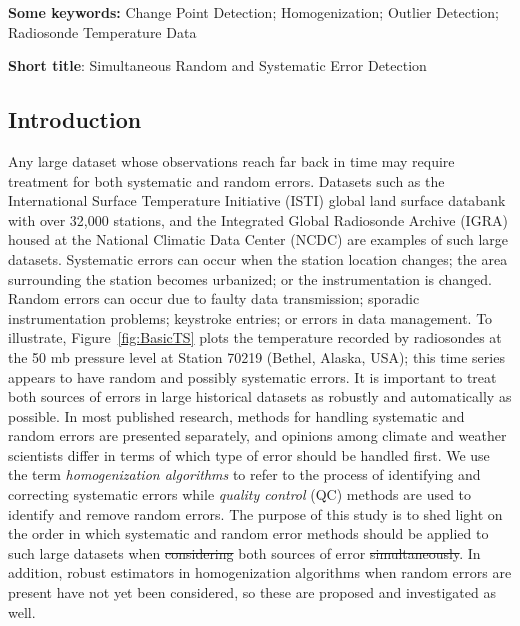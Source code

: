 \documentclass[12pt]{article}
\providecommand{\DIFaddtex}[1]{{\protect\color{blue}\uwave{#1}}} %
\providecommand{\DIFdeltex}[1]{{\protect\color{red}\sout{#1}}}                      %
\providecommand{\DIFaddbegin}{} %
\providecommand{\DIFaddend}{} %
\providecommand{\DIFdelbegin}{} %
\providecommand{\DIFdelend}{} %
\providecommand{\DIFadd}[1]{\texorpdfstring{\DIFaddtex{#1}}{#1}} %
\providecommand{\DIFdel}[1]{\texorpdfstring{\DIFdeltex{#1}}{}} %
\begin{document}
\begin{singlespacing}
\par\vfill\noindent
{\bf Some keywords:} Change Point Detection; Homogenization; Outlier Detection; Radiosonde Temperature Data

\par\medskip\noindent
{\bf Short title}:  Simultaneous Random and Systematic Error Detection

\end{singlespacing}
\clearpage\pagebreak\newpage {}
\begin{doublespacing}


\section{Introduction}


Any large dataset whose observations reach far back in time may require treatment for both systematic and random errors. Datasets such as the International Surface Temperature Initiative (ISTI) global land surface databank \cite{rennie14} with over 32,000 stations, and the Integrated Global Radiosonde Archive (IGRA) housed at the National Climatic Data Center (NCDC) \cite{durre06} are examples of such large datasets. Systematic errors can occur when the station location changes; the area surrounding the station becomes urbanized; or the instrumentation is changed. Random errors can occur due to faulty data transmission; sporadic instrumentation problems; keystroke entries; or errors in data management. To illustrate, Figure~\ref{fig:BasicTS} plots the temperature recorded by radiosondes at the 50 mb pressure level at Station 70219 (Bethel, Alaska, USA); this time series appears to have random and possibly systematic errors.  It is important to treat both sources of errors in  large historical datasets as robustly and automatically as possible. In most published research, methods for handling systematic and random errors are presented separately, and opinions among climate and weather scientists differ in terms of which type of error should be handled first.  We use the term \emph{homogenization algorithms} to refer to the process of identifying and correcting systematic errors while \emph{quality control} (QC) methods are used to identify and remove random errors.   The purpose of this study is to shed light on the order in which systematic and random error methods should be applied to such large datasets when  \DIFdelbegin \DIFdel{considering }\DIFdelend both sources of error \DIFdelbegin \DIFdel{simultaneously}\DIFdelend \DIFaddbegin \DIFadd{are present}\DIFaddend . In addition, robust estimators in homogenization algorithms when random errors are present have not yet been considered, so these are proposed and investigated as well.


\end{doublespacing}
\end{document}
